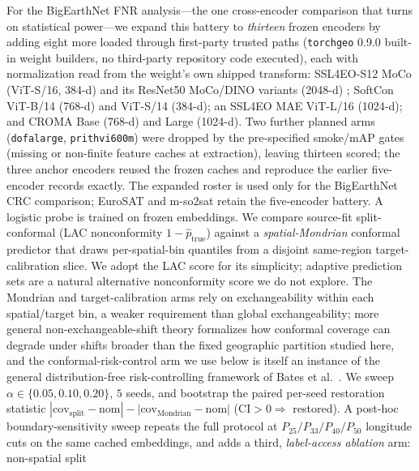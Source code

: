 \documentclass[journal]{IEEEtran}
\renewcommand{\_}{\textunderscore\allowbreak}
\begin{document}
For the BigEarthNet FNR analysis---the one cross-encoder comparison that turns on statistical power---we
expand this battery to \emph{thirteen} frozen encoders by adding eight more loaded through first-party
trusted paths (\texttt{torchgeo} 0.9.0 built-in weight builders, no third-party repository code
executed), each with normalization read from the weight's own shipped transform: SSL4EO-S12 MoCo
(ViT-S/16, 384-d) and its ResNet50 MoCo/DINO variants (2048-d) \citep{wang2023ssl4eo}; SoftCon
\citep{wang2024softcon} ViT-B/14 (768-d) and ViT-S/14 (384-d); an SSL4EO MAE ViT-L/16 (1024-d); and
CROMA \citep{fuller2023croma} Base (768-d) and Large (1024-d). Two further planned arms
(\texttt{dofa\_large}, \texttt{prithvi\_600m}) were dropped by the pre-specified smoke/mAP gates (missing
or non-finite feature caches at extraction), leaving thirteen scored; the three anchor encoders reused
the frozen caches and reproduce the earlier five-encoder records exactly. The expanded roster is used
only for the BigEarthNet CRC comparison; EuroSAT and m-so2sat retain the five-encoder battery.
A logistic probe is trained on frozen embeddings. We compare source-fit
split-conformal \citep{vovk2005algorithmic,angelopoulos2023conformal} (LAC \citep{sadinle2019lac} nonconformity $1-\hat p_{\text{true}}$) against a \emph{spatial-Mondrian} conformal
predictor \citep{vovk2003mondrian} that draws per-spatial-bin quantiles from a disjoint same-region target-calibration slice. We adopt
the LAC score for its simplicity; adaptive prediction sets \citep{romano2020classification} are a natural
alternative nonconformity score we do not explore. The Mondrian and target-calibration arms rely on
exchangeability within each spatial/target bin, a weaker requirement than global exchangeability; more general
non-exchangeable-shift theory \citep{barber2023conformal} formalizes how conformal coverage can degrade under
shifts broader than the fixed geographic partition studied here, and the conformal-risk-control arm we use
below \citep{angelopoulos2024crc} is itself an instance of the general distribution-free risk-controlling
framework of Bates et al.~\citep{bates2021distributionfree}. We sweep
$\alpha\in\{0.05,0.10,0.20\}$, $5$ seeds, and bootstrap the paired per-seed restoration statistic
$|\text{cov}_{\text{split}}-\text{nom}|-|\text{cov}_{\text{Mondrian}}-\text{nom}|$ (CI${}>0\Rightarrow$ restored).
A post-hoc boundary-sensitivity sweep repeats the full protocol at $P_{25}/P_{33}/P_{40}/P_{50}$ longitude
cuts on the same cached embeddings, and adds a third, \emph{label-access ablation} arm: non-spatial split
\end{document}

